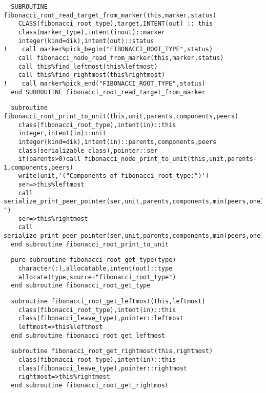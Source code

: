 \begin{Verbatim}
  SUBROUTINE fibonacci_root_read_target_from_marker(this,marker,status)
    CLASS(fibonacci_root_type),target,INTENT(out) :: this
    class(marker_type),intent(inout)::marker
    integer(kind=dik),intent(out)::status
!    call marker%pick_begin("FIBONACCI_ROOT_TYPE",status)
    call fibonacci_node_read_from_marker(this,marker,status)
    call this%find_leftmost(this%leftmost)
    call this%find_rightmost(this%rightmost)
!    call marker%pick_end("FIBONACCI_ROOT_TYPE",status)
  end SUBROUTINE fibonacci_root_read_target_from_marker
\end{Verbatim}

\begin{Verbatim}
  subroutine fibonacci_root_print_to_unit(this,unit,parents,components,peers)
    class(fibonacci_root_type),intent(in)::this
    integer,intent(in)::unit
    integer(kind=dik),intent(in)::parents,components,peers
    class(serializable_class),pointer::ser
    if(parents>0)call fibonacci_node_print_to_unit(this,unit,parents-1,components,peers)
    write(unit,'("Components of fibonacci_root_type:")')
    ser=>this%leftmost
    call serialize_print_peer_pointer(ser,unit,parents,components,min(peers,one),"Leftmost: ")
    ser=>this%rightmost
    call serialize_print_peer_pointer(ser,unit,parents,components,min(peers,one),"Rightmost:")
  end subroutine fibonacci_root_print_to_unit
\end{Verbatim}

\begin{Verbatim}
  pure subroutine fibonacci_root_get_type(type)
    character(:),allocatable,intent(out)::type
    allocate(type,source="fibonacci_root_type")
  end subroutine fibonacci_root_get_type
\end{Verbatim}

\begin{Verbatim}
  subroutine fibonacci_root_get_leftmost(this,leftmost)
    class(fibonacci_root_type),intent(in)::this
    class(fibonacci_leave_type),pointer::leftmost
    leftmost=>this%leftmost
  end subroutine fibonacci_root_get_leftmost
\end{Verbatim}

\begin{Verbatim}
  subroutine fibonacci_root_get_rightmost(this,rightmost)
    class(fibonacci_root_type),intent(in)::this
    class(fibonacci_leave_type),pointer::rightmost
    rightmost=>this%rightmost
  end subroutine fibonacci_root_get_rightmost
\end{Verbatim}

